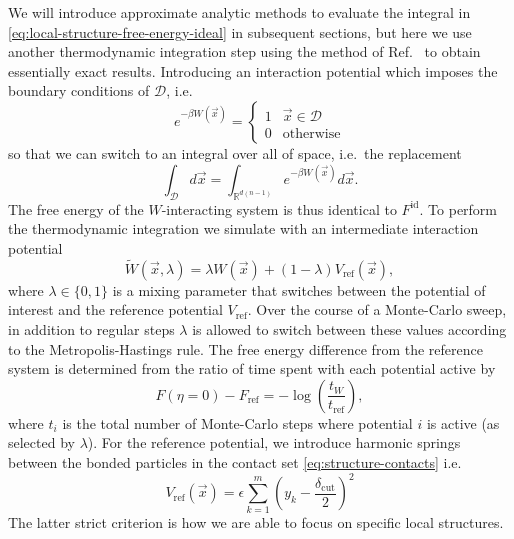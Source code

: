 \documentclass[11pt,twoside]{report}
\begin{document}
We will introduce approximate analytic methods to evaluate the integral in \eqref{eq:local-structure-free-energy-ideal} in subsequent sections, but here we use another thermodynamic integration step using the method of Ref.\ \cite{SchillingJCP2009} to obtain essentially exact results.
Introducing an interaction potential which imposes the boundary conditions of $\mathcal{D}$, i.e.\
\begin{equation*}
  e^{-\beta W(\vec{x})}
  =
  \begin{cases}
    1 & \vec{x} \in \mathcal{D} \\
    0 & \textrm{otherwise}
  \end{cases}
\end{equation*}
so that we can switch to an integral over all of space, i.e.\ the replacement
\begin{equation*}
  \int_{\mathcal{D}} d\vec{x}
  =
  \int_{\mathbb{R}^{d(n-1)}} e^{-\beta W(\vec{x})} d\vec{x}.
\end{equation*}
The free energy of the $W$-interacting system is thus identical to $F^\mathrm{id}$.
To perform the thermodynamic integration we simulate with an intermediate interaction potential \cite{SchillingJCP2009}
\begin{equation*}
  \widetilde{W}(\vec{x}, \lambda)
  =
  \lambda W(\vec{x}) + (1-\lambda) V_\mathrm{ref}(\vec{x}),
\end{equation*}
where $\lambda \in \{0,1\}$ is a mixing parameter that switches between the potential of interest and the reference potential $V_\mathrm{ref}$.
Over the course of a Monte-Carlo sweep, in addition to regular steps $\lambda$ is allowed to switch between these values according to the Metropolis-Hastings rule.
The free energy difference from the reference system is determined from the ratio of time spent with each potential active by
\begin{equation}\label{eq:ideal-free-energy-change}
  F(\eta = 0) - F_\mathrm{ref}
  = -\log{\left( \frac{t_W}{t_\mathrm{ref}} \right)},
\end{equation}
where $t_i$ is the total number of Monte-Carlo steps where potential $i$ is active (as selected by $\lambda$).
For the reference potential, we introduce harmonic springs between the bonded particles in the contact set \eqref{eq:structure-contacts} i.e.\
\begin{equation*}
  V_\mathrm{ref}(\vec{x})
  =
  \epsilon \sum_{k=1}^m \left( y_k - \frac{\delta_\mathrm{cut}}{2} \right)^2
\end{equation*}
The latter strict criterion is how we are able to focus on specific local structures.
\end{document}
